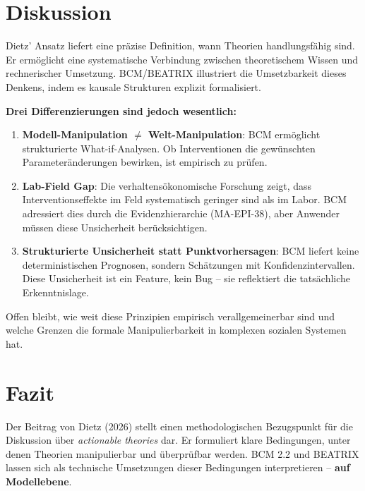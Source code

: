 \documentclass[12pt,a4paper]{article}
\begin{document}
\section{Diskussion}

Dietz' Ansatz liefert eine präzise Definition, wann Theorien handlungsfähig sind.
Er ermöglicht eine systematische Verbindung zwischen theoretischem Wissen und rechnerischer Umsetzung.
BCM/BEATRIX illustriert die Umsetzbarkeit dieses Denkens, indem es kausale Strukturen explizit formalisiert.

\textbf{Drei Differenzierungen sind jedoch wesentlich:}

\begin{enumerate}
    \item \textbf{Modell-Manipulation $\neq$ Welt-Manipulation}: BCM ermöglicht strukturierte What-if-Analysen. Ob Interventionen die gewünschten Parameteränderungen bewirken, ist empirisch zu prüfen.

    \item \textbf{Lab-Field Gap}: Die verhaltensökonomische Forschung zeigt, dass Interventionseffekte im Feld systematisch geringer sind als im Labor. BCM adressiert dies durch die Evidenzhierarchie (MA-EPI-38), aber Anwender müssen diese Unsicherheit berücksichtigen.

    \item \textbf{Strukturierte Unsicherheit statt Punktvorhersagen}: BCM liefert keine deterministischen Prognosen, sondern Schätzungen mit Konfidenzintervallen. Diese Unsicherheit ist ein Feature, kein Bug -- sie reflektiert die tatsächliche Erkenntnislage.
\end{enumerate}

Offen bleibt, wie weit diese Prinzipien empirisch verallgemeinerbar sind und welche Grenzen die formale Manipulierbarkeit in komplexen sozialen Systemen hat.

\section{Fazit}

Der Beitrag von Dietz (2026) stellt einen methodologischen Bezugspunkt für die Diskussion über \textit{actionable theories} dar.
Er formuliert klare Bedingungen, unter denen Theorien manipulierbar und überprüfbar werden.
BCM 2.2 und BEATRIX lassen sich als technische Umsetzungen dieser Bedingungen interpretieren -- \textbf{auf Modellebene}.
\end{document}
